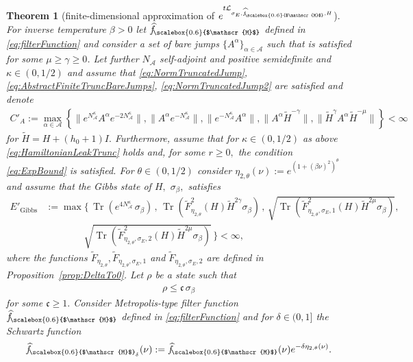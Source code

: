 \documentclass[11pt]{amsart}
\newcommand{\1}{\mathbbm{1}}
\newcommand{\Tr}{\operatorname{Tr}}
\newcommand{\cL}{\mathcal{L}}
\newcommand{\NA}{N_{\mathcal{A}}}
\newcommand{\cA}{\mathcal{A}}
\newcommand{\hatfM}{\widehat{f}_{\!\scalebox{0.6}{$\mathscr{M}$}}
}
\newcommand{\hatfMdelta}{\widehat{f}_{\!\scalebox{0.6}{$\mathscr{M}$}_\delta}}
\theoremstyle{plain}
\newtheorem{theorem}{Theorem}[section]
\theoremstyle{definition}
\theoremstyle{remark}
\numberwithin{equation}{section}
\begin{document}
\begin{theorem}[finite-dimensional approximation of $e^{t\cL_{\sigma_E,\hatfM,H}}$]
\label{thm:SingularGibbsdynamics}
For inverse temperature $\beta>0$ let $\hatfM$ defined in \eqref{eq:filterFunction} and consider a set of bare jumps $\{A^\alpha\}_{\alpha\in\cA}$ such that   is satisfied for some $\mu\ge \gamma\ge 0$. 
Let further $\NA$ self-adjoint and positive semidefinite and $\kappa\in(0,1/2)$ and assume that \eqref{eq:NormTruncatedJump}, \eqref{eq:AbstractFiniteTruncBareJumps}, \eqref{eq:NormTruncatedJump2} are satisfied and denote \begin{align*}
    C'_{A} := \max_{\alpha\in\cA}\left\{\|e^{\NA^{\kappa}}A^{\alpha}e^{-2\NA^{\kappa}}\|,\|A^{\alpha}e^{-\NA^{\kappa}}\|,\|e^{-\NA^{\kappa}}A^{\alpha}\|, \|A^\alpha\widetilde H^{-\gamma}\|,\|\widetilde H^{\gamma}A^\alpha\widetilde H^{-\mu}\|\right\}<\infty
\end{align*} 
for $\widetilde H= H + (h_0+1)I.$ Furthermore, assume that for $\kappa\in(0,1/2)$ as above \eqref{eq:HamiltonianLeakTrunc} holds and, for some $r\ge 0,$ the condition \eqref{eq:ExpBound} is satisfied.  For $\theta\in(0,1/2)$ consider $\eta_{2,\theta}(\nu) := e^{(1+(\beta\nu)^2)^\theta}$ and assume that the Gibbs state of $H,$ $\sigma_\beta,$ satisfies
\begin{align*}
E'_{\operatorname{Gibbs}}&:=\max\Big\{\,\Tr\left(e^{4\NA^\kappa}\, \sigma_\beta\right)\,,\,\Tr\left( \widetilde F^2_{\eta_{2,\theta}}(H) \widetilde H^{2\gamma}\sigma_\beta\right)\,,\, \sqrt{\Tr\left(\widetilde F^2_{\eta_{2,\theta},\sigma_E,1}(H) \widetilde H^{2\mu}\sigma_\beta\right)},\\&\qquad\qquad \sqrt{\Tr\left(\widetilde F^2_{\eta_{2,\theta},\sigma_E,2}(H) \widetilde H^{2\mu}\sigma_\beta\right)}\,\Big\}<\infty,
\end{align*}
where the functions $\widetilde F_{\eta_{2,\theta}},\widetilde F_{\eta_{2,\theta},\sigma_E,1}$ and $\widetilde F_{\eta_{2,\theta},\sigma_E,2}$ are defined in Proposition~\ref{prop:DeltaTo0}.
Let $\rho$ be a state such that 
\begin{align}
\label{eq:InputDmaxConstraint2}
    \rho \le \mathfrak{c}\,\sigma_\beta
\end{align}
for some $\mathfrak{c}\ge 1.$ 
Consider Metropolis-type filter function  $\hatfM$ defined in \eqref{eq:filterFunction} and for $\delta\in(0,1]$  the Schwartz function
 \begin{align*}
    \hatfMdelta(\nu) := \hatfM(\nu)e^{-\delta\eta_{2,\theta}(\nu)}.
\end{align*}

\end{theorem}
\end{document}
